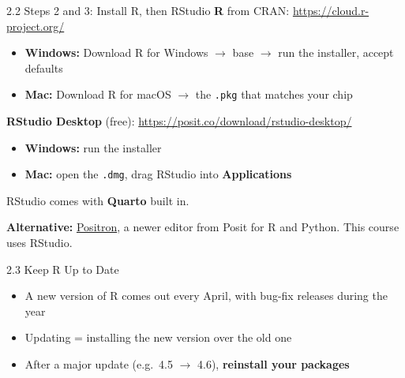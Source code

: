 \documentclass[
  ignorenonframetext,
  aspectratio=169,
]{beamer}
\providecommand{\tightlist}{%
  \setlength{\itemsep}{0pt}\setlength{\parskip}{0pt}}
\begin{document}
\begin{frame}[fragile]{2.2 Steps 2 and 3: Install R, then RStudio}
\protect{}\label{steps-2-and-3-install-r-then-rstudio}
\textbf{R} from CRAN: \url{https://cloud.r-project.org/}

\begin{itemize}
\tightlist
\item
  \textbf{Windows:} Download R for Windows \(\rightarrow\) base
  \(\rightarrow\) run the installer, accept defaults
\item
  \textbf{Mac:} Download R for macOS \(\rightarrow\) the \texttt{.pkg}
  that matches your chip
\end{itemize}

\textbf{RStudio Desktop} (free):
\url{https://posit.co/download/rstudio-desktop/}

\begin{itemize}
\tightlist
\item
  \textbf{Windows:} run the installer
\item
  \textbf{Mac:} open the \texttt{.dmg}, drag RStudio into
  \textbf{Applications}
\end{itemize}

RStudio comes with \textbf{Quarto} built in.

\textbf{Alternative:} \href{https://positron.posit.co/}{Positron}, a
newer editor from Posit for R and Python. This course uses RStudio.
\end{frame}

\begin{frame}{2.3 Keep R Up to Date}
\protect{}\label{keep-r-up-to-date}
\begin{itemize}
\tightlist
\item
  A new version of R comes out every April, with bug-fix releases during
  the year
\item
  Updating = installing the new version over the old one
\item
  After a major update (e.g.~4.5 \(\rightarrow\) 4.6), \textbf{reinstall
  your packages}
\end{itemize}
\end{frame}
\end{document}
